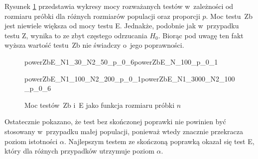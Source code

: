 Rysunek \ref{powerZbE_n} przedstawia wykresy mocy rozważanych testów w~zależności od rozmiaru próbki dla różnych rozmiarów populacji oraz proporcji $p$. Moc testu~Zb jest niewiele większa od mocy testu E. Jednakże, podobnie jak w~przypadku testu Z, wynika to ze zbyt częstego odrzucania $H_0$. Biorąc pod uwagę ten fakt wyższa wartość testu~Zb nie świadczy o~jego poprawności.

\begin{figure}[!h]
	\begin{subdiagrams}{powerZbE_N1_30_N2_50_p_0_6}{powerZbE_N_100_p_0_1}
	\end{subdiagrams}
	
	\begin{subdiagrams}{powerZbE_N1_100_N2_200_p_0_1}{powerZbE_N1_3000_N2_100_p_0_6}
	\end{subdiagrams}
	
	\caption{Moc testów~Zb i~E jako funkcja rozmiaru próbki $n$}
	\label{powerZbE_n}
\end{figure}

Ostatecznie pokazano, że test bez skończonej poprawki nie powinien być stosowany w~przypadku małej populacji, ponieważ wtedy znacznie  przekracza poziom istotności $\alpha$. Najlepszym testem ze skończoną poprawką okazał się test E, który dla różnych przypadków utrzymuje poziom $\alpha$. 